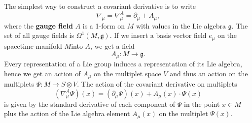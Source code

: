 \documentclass[12pt]{amsart}
\theoremstyle{definition}
\theoremstyle{remark}
\numberwithin{equation}{section}
\begin{document}
The simplest way to construct a covariant derivative is to write
\begin{equation*}
\nabla_\mu = \nabla_\mu^A= \partial_\mu+A_\mu,
\end{equation*}
where the {\bf gauge field} $A$ is a 1-form on $M$ with values in the Lie algebra $\mathfrak{g}$. The set of all gauge fields is $\Omega^1(M,\mathfrak{g})$. If we insert a basis vector field $e_\mu$ on the spacetime manifold $M$into $A$, we get a field
\begin{equation*}
A_\mu\colon M\longrightarrow\mathfrak{g}.
\end{equation*}
Every representation of a Lie group induces a representation of its Lie algebra, hence we get an action of $A_\mu$ on the multiplet space $V$ and thus an action on the multiplets $\Psi\colon M\rightarrow S\otimes V$. The action of the covariant derivative on multiplets
\begin{equation*}
(\nabla^A_\mu\Psi)(x)=(\partial_\mu\Psi)(x)+A_\mu(x)\cdot\Psi(x)
\end{equation*}
is given by the standard derivative of each component of $\Psi$ in the point $x\in M$ plus the action of the Lie algebra element $A_\mu(x)$ on the multiplet $\Psi(x)$.
\end{document}
